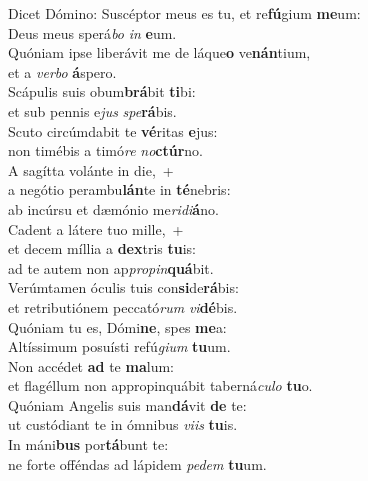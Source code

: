 \evenverse Dicet Dómino: Suscéptor meus es tu, et re\textbf{fú}gium \textbf{me}um:~\*\\
\evenverse Deus meus sperá\textit{bo} \textit{in} \textbf{e}um.\\
\oddverse Quóniam ipse liberávit me de láque\textbf{o} ve\textbf{nán}tium,~\*\\
\oddverse et a \textit{ver}\textit{bo} \textbf{á}spero.\\
\evenverse Scápulis suis obum\textbf{brá}bit \textbf{ti}bi:~\*\\
\evenverse et sub pennis e\textit{jus} \textit{spe}\textbf{rá}bis.\\
\oddverse Scuto circúmdabit te \textbf{vé}ritas \textbf{e}jus:~\*\\
\oddverse non timébis a timó\textit{re} \textit{no}\textbf{ctúr}no.\\
\evenverse A sagítta volánte in die,~+\\
\evenverse  a negótio perambu\textbf{lán}te in \textbf{té}nebris:~\*\\
\evenverse ab incúrsu et dæmónio me\textit{ri}\textit{di}\textbf{á}no.\\
\oddverse Cadent a látere tuo mille,~+\\
\oddverse  et decem míllia a \textbf{dex}tris \textbf{tu}is:~\*\\
\oddverse ad te autem non ap\textit{pro}\textit{pin}\textbf{quá}bit.\\
\evenverse Verúmtamen óculis tuis con\textbf{si}de\textbf{rá}bis:~\*\\
\evenverse et retributiónem peccató\textit{rum} \textit{vi}\textbf{dé}bis.\\
\oddverse Quóniam tu es, Dómi\textbf{ne}, spes \textbf{me}a:~\*\\
\oddverse Altíssimum posuísti refú\textit{gi}\textit{um} \textbf{tu}um.\\
\evenverse Non accédet \textbf{ad} te \textbf{ma}lum:~\*\\
\evenverse et flagéllum non appropinquábit taberná\textit{cu}\textit{lo} \textbf{tu}o.\\
\oddverse Quóniam Angelis suis man\textbf{dá}vit \textbf{de} te:~\*\\
\oddverse ut custódiant te in ómnibus \textit{vi}\textit{is} \textbf{tu}is.\\
\evenverse In máni\textbf{bus} por\textbf{tá}bunt te:~\*\\
\evenverse ne forte offéndas ad lápidem \textit{pe}\textit{dem} \textbf{tu}um.\\
